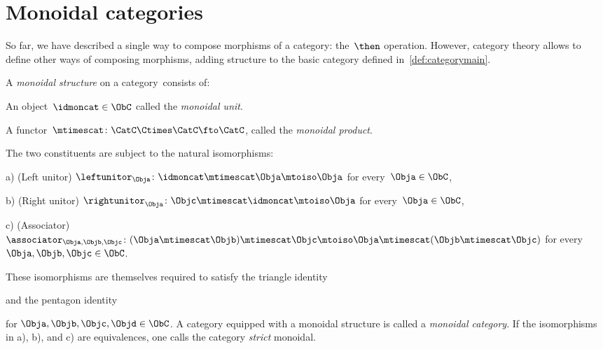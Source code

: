 

\section{Monoidal categories}
\label{sec:parallelism-mon-cat}

So far, we have described a single way to compose morphisms of a category: the~$\then$ operation. However, category theory allows to define other ways of composing morphisms, adding structure to the basic category defined in~\cref{def:categorymain}.


\begin{ctdefinition}
  \label{def:monoidal_cat}
  A \emph{monoidal structure} on a category~\CatC consists of:
  \begin{compactenum}
    \item An object~$\idmoncat \in \ObC$ called the \emph{monoidal unit}.
    \item A functor~$\mtimescat \colon \CatC \Ctimes \CatC\fto \CatC$, called the \emph{monoidal product}.
  \end{compactenum}
  The two constituents are subject to the natural isomorphisms:
  \begin{compactenum}
    \item[a)] (Left unitor) $\leftunitor_\Obja \colon \idmoncat\mtimescat \Obja \mtoiso \Obja$ for every~$\Obja\in \ObC$,
    \item[b)] (Right unitor) $\rightunitor_\Obja \colon \Objc \mtimescat \idmoncat \mtoiso \Obja$ for every~$\Obja\in \ObC$,
    \item[c)] (Associator) $\associator_{\Obja,\Objb,\Objc}\colon (\Obja \mtimescat \Objb )\mtimescat \Objc \mtoiso \Obja\mtimescat (\Objb \mtimescat \Objc)$ for every~$\Obja,\Objb,\Objc\in \ObC$.
  \end{compactenum}
  These isomorphisms are themselves required to satisfy the triangle identity
  \begin{center}
  \end{center}
  and the pentagon identity
  \begin{center}
  \end{center}
  for $\Obja,\Objb,\Objc,\Objd\in \ObC$.
  \noindent A category equipped with a monoidal structure is called a \emph{monoidal category}.
  If the isomorphisms in a), b), and c) are equivalences, one calls the category \emph{strict} monoidal.
\end{ctdefinition}

